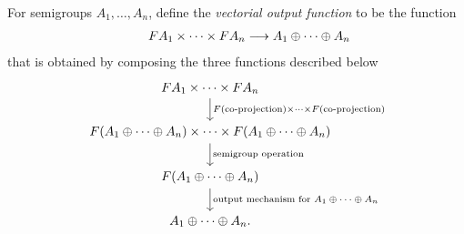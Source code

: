For semigroups $A_1,\ldots,A_n$, define the \emph{vectorial output function} to be the 
function%
\begin{align*}
\qquad\functor A_1 \times \cdots \times \functor A_n \longrightarrow A_1 \oplus \cdots \oplus A_n
\end{align*}
that is obtained by composing the three functions described below
\[
\begin{tikzcd}
\functor A_1 \times \cdots \times \functor A_n
\ar[d,"\functor(\text{co-projection}) \times \cdots \times \functor(\text{co-projection})"]
\\
\functor(A_1 \oplus \cdots \oplus A_n)
\times
\cdots
\times 
\functor(A_1 \oplus \cdots \oplus A_n)
\ar[d,"\text{semigroup operation}"]
\\
\functor(A_1 \oplus \cdots \oplus A_n)
\ar[d, "\text{output mechanism for $A_1 \oplus \cdots \oplus A_n$}"]\\ 
A_1 \oplus \cdots \oplus A_n.
\end{tikzcd}
\]

